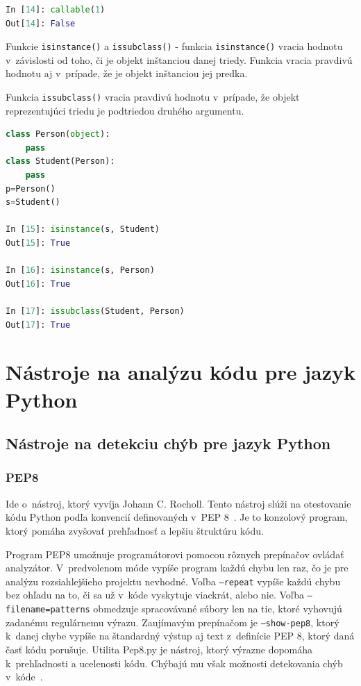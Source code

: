 \documentclass[11pt,oneside,final]{fithesis2}
\begin{document}
\begin{list}{•}{}
\begin{lstlisting}[language=python]
In [14]: callable(1)
Out[14]: False
\end{lstlisting}			


		\item Funkcie \texttt{isinstance()} a \texttt{issubclass()} - 
		funkcia \texttt{isinstance()} vracia hodnotu v~závislosti od toho, či je objekt inštanciou danej triedy. Funkcia vracia pravdivú hodnotu aj v~prípade, že je objekt inštanciou jej predka.
		
		Funkcia \texttt{issubclass()} vracia pravdivú hodnotu v~prípade, že objekt reprezentujúci triedu je podtriedou druhého argumentu.

\begin{lstlisting}[language=python]	
class Person(object):
    pass
class Student(Person):
    pass
p=Person()
s=Student()

In [15]: isinstance(s, Student)
Out[15]: True

In [16]: isinstance(s, Person)
Out[16]: True

In [17]: issubclass(Student, Person)
Out[17]: True
\end{lstlisting}		

\end{list}


\chapter{Nástroje na analýzu kódu pre jazyk Python}
	\section{Nástroje na detekciu chýb pre jazyk Python}	


\subsection{PEP8}
	Ide o~nástroj, ktorý vyvíja Johann C. Rocholl. Tento nástroj slúži na otestovanie kódu Python podľa konvencií definovaných v~PEP 8~\cite{pep8}. Je to konzolový program, ktorý pomáha zvyšovať prehľadnosť a lepšiu štruktúru kódu. 
	
	Program PEP8 umožnuje programátorovi pomocou rôznych prepínačov ovládať analyzátor. V~predvolenom móde vypíše program každú chybu len raz, čo je pre analýzu rozsiahlejšieho projektu nevhodné. Voľba \texttt{–repeat} vypíše každú chybu bez ohľadu na to, či sa už v~kóde vyskytuje viackrát, alebo nie. Voľba \texttt{–filename=patterns} obmedzuje spracovávané súbory len na tie, ktoré vyhovujú zadanému regulárnemu výrazu. Zaujímavým prepínačom je \texttt{–show-pep8}, ktorý k~danej chybe vypíše na štandardný výstup aj text z~definície PEP 8, ktorý daná časť kódu porušuje.
    Utilita Pep8.py je nástroj, ktorý výrazne dopomáha k~prehľadnosti a ucelenosti kódu. Chýbajú mu však možnosti detekovania chýb v~kóde~\cite{pep8}.
\end{document}
